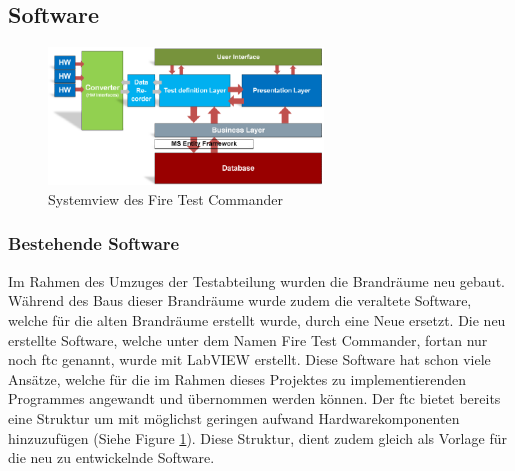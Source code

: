 \documentclass[10pt]{scrartcl}
\begin{document}
\subsection{Software}
\begin{figure}
	\begin{center}
		\includegraphics[width=0.65\textwidth]{SystemviewFTC}
		\caption{Systemview des Fire Test Commander}
		\label{fig:SystemViewFTC}
	\end{center}
\end{figure}
\subsubsection{Bestehende Software}
Im Rahmen des Umzuges der Testabteilung wurden die Brandräume neu gebaut. Während des Baus dieser Brandräume wurde zudem die veraltete Software, welche für die alten Brandräume erstellt wurde, durch eine Neue ersetzt. Die neu erstellte Software, welche unter dem Namen Fire Test Commander, fortan nur noch \acrshort{ftc} genannt, wurde mit \gls{LabVIEW} erstellt. Diese Software hat schon viele Ansätze, welche für die im Rahmen dieses Projektes zu implementierenden Programmes angewandt und übernommen werden können. Der \acrshort{ftc} bietet bereits eine Struktur um mit möglichst geringen aufwand Hardwarekomponenten hinzuzufügen (Siehe Figure \ref{fig:SystemViewFTC}). Diese Struktur, dient zudem gleich als Vorlage für die neu zu entwickelnde Software.
\newpage
\end{document}
